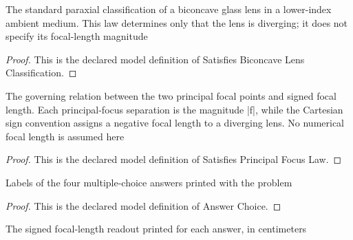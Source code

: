 \begin{definition}
  \label{def:physics:phyx-mini-0066:phyxminiproblems-problemphyxmini0066-satisfiesbiconcavelensclassification}
  The standard paraxial classification of a biconcave glass lens in a lower-index ambient medium. This law determines only that the lens is diverging; it does not specify its focal-length magnitude
\end{definition}
\begin{proof}
  This is the declared model definition of Satisfies Biconcave Lens Classification.
\end{proof}
\begin{definition}
  \label{def:physics:phyx-mini-0066:phyxminiproblems-problemphyxmini0066-satisfiesprincipalfocuslaw}
  The governing relation between the two principal focal points and signed focal length. Each principal-focus separation is the magnitude |f|, while the Cartesian sign convention assigns a negative focal length to a diverging lens. No numerical focal length is assumed here
\end{definition}
\begin{proof}
  This is the declared model definition of Satisfies Principal Focus Law.
\end{proof}
\begin{definition}
  \label{def:physics:phyx-mini-0066:phyxminiproblems-problemphyxmini0066-answerchoice}
  Labels of the four multiple-choice answers printed with the problem
\end{definition}
\begin{proof}
  This is the declared model definition of Answer Choice.
\end{proof}
\begin{definition}
  \label{def:physics:phyx-mini-0066:phyxminiproblems-problemphyxmini0066-answerfocallengthincentimeters}
  The signed focal-length readout printed for each answer, in centimeters
\end{definition}
